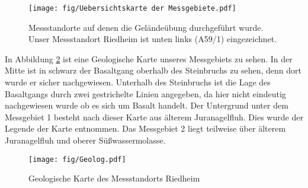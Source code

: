 \begin{figure}[h]
 \centering
 \texttt{[image: fig/Uebersichtskarte der Messgebiete.pdf]}
 \caption[Messgebiete]{Messstandorte auf denen die Geländeübung durchgeführt wurde. Unser Messstandort Riedheim ist unten links (A59/1) eingezeichnet.}
 \label{abb:Messgebiete}
\end{figure}

In Abbildung \ref{abb:Geolog} ist eine Geologische Karte unseres Messgebiets zu sehen. In der Mitte ist in schwarz der Basaltgang oberhalb des Steinbruchs zu sehen, denn dort wurde er sicher nachgewiesen.
Unterhalb des Steinbruchs ist die Lage des Basaltgangs durch zwei gestrichelte Linien angegeben, da hier nicht eindeutig nachgewiesen wurde ob es sich um Basalt handelt. Der Untergrund unter dem Messgebiet 1 besteht nach dieser Karte aus älterem Juranagelfluh. Dies wurde der Legende der Karte entnommen. Das Messgebiet 2 liegt teilweise über älterem Juranagelfluh und oberer Süßwassermolasse.

\begin{figure}
 \centering
 \texttt{[image: fig/Geolog.pdf]}
 \caption[Geologische Karte]{Geologische Karte des Messstandorts Riedheim}
 \label{abb:Geolog}
\end{figure}


